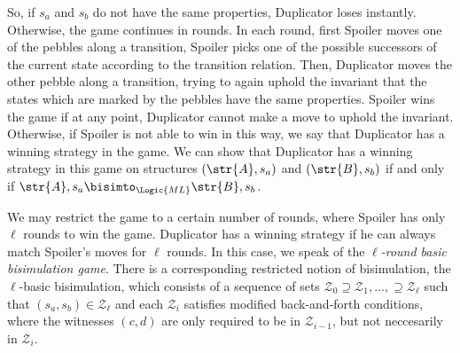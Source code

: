 So, if $s_{a}$ and $s_{b}$ do not have the same properties, Duplicator loses instantly.
Otherwise, the game continues in rounds.
In each round, first Spoiler moves one of the pebbles along a transition, \ie{} Spoiler picks one of the possible successors of the current state according to the transition relation.
Then, Duplicator moves the other pebble along a transition, trying to again uphold the invariant that the states which are marked by the pebbles have the same properties.
Spoiler wins the game if at any point, Duplicator cannot make a move to uphold the invariant.
Otherwise, if Spoiler is not able to win in this way, we say that Duplicator has a winning strategy in the game.
We can show that Duplicator has a winning strategy in this game on structures $(\str{A}, s_{a})$ and $(\str{B}, s_{b})$ if and only if $\str{A}, s_{a} \bisimto_{\Logic{ML}} \str{B}, s_{b}$.

We may restrict the game to a certain number of rounds, where Spoiler has only $\ell$ rounds to win the game.
Duplicator has a winning strategy if he can always match Spoiler's moves for $\ell$ rounds.
In this case, we speak of the \emph{$\ell$-round basic bisimulation game}.
There is a corresponding restricted notion of bisimulation, the $\ell$-basic bisimulation, which consists of a sequence of sets $\mathcal{Z}_{0} \supseteq \mathcal{Z}_{1}, \ldots, \supseteq \mathcal{Z}_{\ell}$ such that $(s_{a}, s_{b}) \in \mathcal{Z}_{\ell}$ and each $\mathcal{Z}_{i}$ satisfies modified back-and-forth conditions, where the witnesses $(c,d)$ are only required to be in $\mathcal{Z}_{i-1}$, but not neccesarily in $\mathcal{Z}_{i}$.


